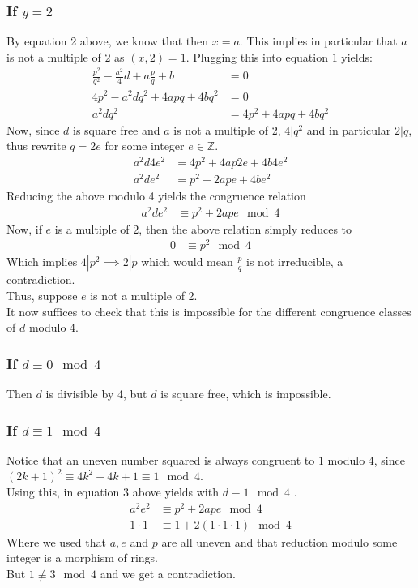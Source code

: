 \documentclass[11pt, a4paper]{article}
\begin{document}
\subsubsection*{ If $y=2$ }
By equation 2 above, we know that then $ x=a$.
This implies in particular that $a$ is not a multiple of $2$ as $( x,2) =1$. 
Plugging this into equation $1$ yields:
\begin{align*}
	\frac{p^{2}}{q ^{2}} - \frac{a^{2}}{4} d + a \frac{p}{q}+b &=0\\
	4p^{2} - a^{2}d q^{2} + 4 a pq + 4bq^{2} &=0\\
	a^{2}dq^{2} &= 4p^{2} + 4 a pq + 4 bq^{2}
\end{align*}
Now, since $d$ is square free and $a$ is not a multiple of 2, $4 | q^{2}$ and in particular $2 | q$, thus rewrite $q = 2 e $ for some integer $e \in \mathbb{Z}$.\\
\begin{align*}
	a^{2} d 4 e^{2} &= 4 p^{2} + 4 a p 2 e + 4b 4 e^{2}\\
	a^{2} d e^{2} &= p^{2} + 2 ape + 4be^{2}
\end{align*}
Reducing the above modulo 4 yields the congruence relation
\begin{align}
	a^{2} d e^{2} &\equiv p^{2} + 2 a p e \mod 4
\end{align}
Now, if $e$ is a multiple of $2$, then the above relation simply reduces to
\begin{align*}
	0 &\equiv p^{2}\mod 4
\end{align*}
Which implies $4 | p^{2} \implies 2 | p$ which would mean $\frac{p}{q}$ is not irreducible, a contradiction.\\
Thus, suppose $e$ is not a multiple of 2.\\
It now suffices to check that this is impossible for the different congruence classes of $d$ modulo 4.
\subsubsection*{If $d \equiv 0 \mod 4$ }
Then $d$ is divisible by 4, but $d$ is square free, which is impossible.
\subsubsection*{If $d\equiv 1 \mod 4$ }
Notice that an uneven number squared is always congruent to $1$ modulo 4, since $( 2k+1)^{2} \equiv 4k^{2} + 4k + 1 \equiv 1 \mod 4$.\\
Using this, in equation 3 above yields with $d\equiv 1 \mod 4$ .\\
\begin{align*}
	a^{2} e ^{2} &\equiv p^{2} + 2 ape \mod 4\\
	1 \cdot 1 &\equiv 1 + 2 ( 1\cdot 1 \cdot 1) \mod 4	
\end{align*}
Where we used that $a,e $ and $p$ are all uneven and that reduction modulo some integer is a morphism of rings.\\
But $1 \not\equiv 3 \mod 4$ and we get a contradiction.
\end{document}
